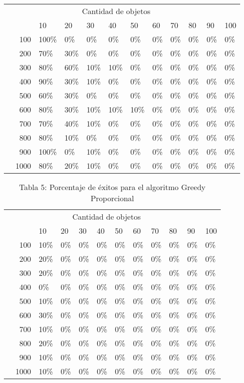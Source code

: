 \documentclass{article}
\begin{document}
\begin{center}
\begin{table}[ht]
\begin{tabularx}{0.8\textwidth}{Xr|XXXXXXXXXX}
&\multicolumn{10}{c}{Cantidad de objetos} \\
&&10&20&30&40&50&60&70&80&90&100\\\hline
\parbox[t]{2mm}{}&100&100\%&0\%&0\%&0\%&0\%&0\%&0\%&0\%&0\%&0\%\\
&200&70\%&30\%&0\%&0\%&0\%&0\%&0\%&0\%&0\%&0\%\\
&300&80\%&60\%&10\%&10\%&0\%&0\%&0\%&0\%&0\%&0\%\\
&400&90\%&30\%&10\%&0\%&0\%&0\%&0\%&0\%&0\%&0\%\\
&500&60\%&30\%&0\%&0\%&0\%&0\%&0\%&0\%&0\%&0\%\\
&600&80\%&30\%&10\%&10\%&10\%&0\%&0\%&0\%&0\%&0\%\\
&700&70\%&40\%&10\%&0\%&0\%&0\%&0\%&0\%&0\%&0\%\\
&800&80\%&10\%&0\%&0\%&0\%&0\%&0\%&0\%&0\%&0\%\\
&900&100\%&0\%&10\%&0\%&0\%&0\%&0\%&0\%&0\%&0\%\\
&1000&80\%&20\%&10\%&0\%&0\%&0\%&0\%&0\%&0\%&0\%\\
\end{tabularx}
\end{table}
\begin{table}[ht]
\centering
\caption*{Tabla 5: Porcentaje de éxitos para el algoritmo Greedy Proporcional}
\label{5}
\begin{tabularx}{0.8\textwidth}{Xr|XXXXXXXXXX}
&\multicolumn{10}{c}{Cantidad de objetos} \\
&&10&20&30&40&50&60&70&80&90&100\\\hline
\parbox[t]{2mm}{}&100&10\%&0\%&0\%&0\%&0\%&0\%&0\%&0\%&0\%&0\%\\
&200&20\%&0\%&0\%&0\%&0\%&0\%&0\%&0\%&0\%&0\%\\
&300&20\%&0\%&0\%&0\%&0\%&0\%&0\%&0\%&0\%&0\%\\
&400&0\%&0\%&0\%&0\%&0\%&0\%&0\%&0\%&0\%&0\%\\
&500&10\%&0\%&0\%&0\%&0\%&0\%&0\%&0\%&0\%&0\%\\
&600&30\%&0\%&0\%&0\%&0\%&0\%&0\%&0\%&0\%&0\%\\
&700&10\%&0\%&0\%&0\%&0\%&0\%&0\%&0\%&0\%&0\%\\
&800&20\%&0\%&0\%&0\%&0\%&0\%&0\%&0\%&0\%&0\%\\
&900&10\%&0\%&0\%&0\%&0\%&0\%&0\%&0\%&0\%&0\%\\
&1000&10\%&0\%&0\%&0\%&0\%&0\%&0\%&0\%&0\%&0\%\\
\end{tabularx}
\end{table}
\end{center}
\end{document}
